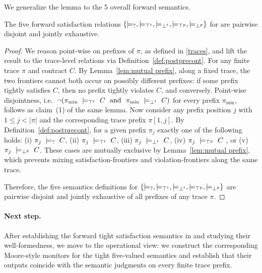We generalize the lemma to the 5 overall forward semantics.
\begin{theorem}\label{thm:five-partition}
The five forward satisfaction relations
$\{\models_{?},\models_{\top^t},\models_{\bot^t},\models_{\top^p},\models_{\bot^p}\}$ for \cDL are pairwise disjoint and jointly exhaustive.
\end{theorem}
\begin{proof}
We reason point-wise on prefixes of $\pi$, as defined in \ref{traces}, and lift the result to the trace-level relations via Definition~\ref{def:postprecont}. For any finite trace $\pi$ and contract $C$.
By Lemma~\ref{lem:mutual prefix}, along a fixed trace, the two frontiers cannot both occur on possibly different prefixes: if some prefix tightly satisfies $C$, then no prefix tightly violates $C$, and conversely.
Point-wise disjointness, i.e.\ $\neg(\pi_{\min}\ \satt\ C\ \nd\ \pi_{\min}\ \violt\ C)$ for every prefix $\pi_{\min}$, follows as claim~(1) of the same lemma.
Now consider any prefix position $j$ with $1\le j<|\pi|$ and the corresponding trace prefix $\pi[1,j]$.
By Definition~\ref{def:postprecont}, for a given prefix $\pi_j$ exactly one of the following holds:
(i) $\pi_{j}\ \models_{?}\ C$, (ii) $\pi_{j}\ \models_{\top^t}\ C$, (iii) $\pi_{j}\ \models_{\bot^t}\ C$, (iv) $\pi_{j}\ \models_{\top^p}\ C$ , or
(v) $\pi_{j}\ \models_{\bot^p}\ C$. These cases are mutually exclusive by Lemma~\ref{lem:mutual prefix}, which prevents mixing satisfaction-frontiers and violation-frontiers along the same trace.

Therefore, the five semantics definitions for $\{\models_{?},\models_{\top^t},\models_{\bot^t},\models_{\top^p},\models_{\bot^p}\}$ are pairwise disjoint and jointly exhaustive of all prefixes of any trace $\pi$.
\end{proof}

\paragraph{Next step.}
After establishing the forward tight satisfaction semantics in \cDL and studying their well-formedness, we move  to the operational view: we construct the corresponding Moore-style monitors for the tight five-valued semantics and establish that their outputs coincide with the semantic judgments on every finite trace prefix.






